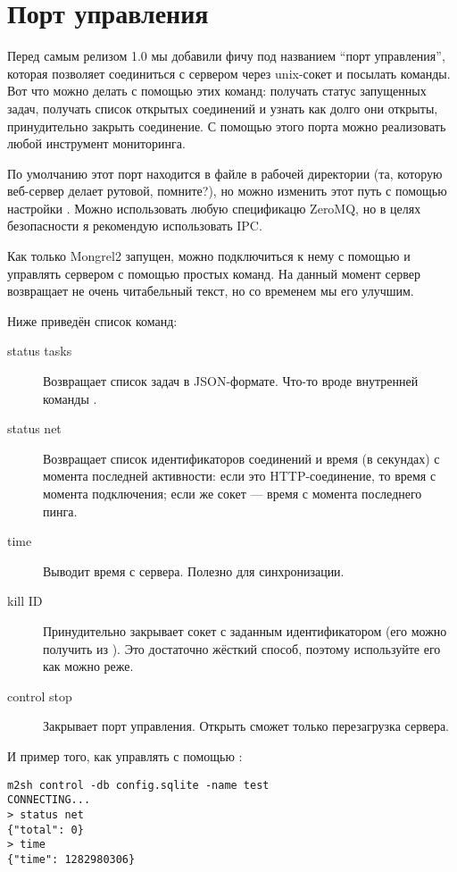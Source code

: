 \section{Порт управления}

Перед самым релизом 1.0 мы добавили фичу под названием ``порт
управления'', которая позволяет соединиться с сервером через unix-сокет
и посылать команды. Вот что можно делать с помощью этих команд:
получать статус запущенных задач, получать список открытых соединений
и узнать как долго они открыты, принудительно закрыть соединение. С
помощью этого порта можно реализовать любой инструмент мониторинга.

По умолчанию этот порт находится в файле  в рабочей
директории (та, которую веб-сервер делает рутовой, помните?), но можно
изменить этот путь с помощью настройки . Можно
использовать любую спецификацю ZeroMQ, но в целях безопасности я
рекомендую использовать IPC.

Как только Mongrel2 запущен, можно подключиться к нему с помощью
 и управлять сервером с помощью простых команд. На данный
момент сервер возвращает не очень читабельный текст, но со временем мы
его улучшим.

Ниже приведён список команд:

\begin{description}
\item[status tasks] Возвращает список задач в JSON-формате. Что-то вроде
    внутренней команды .
\item[status net] Возвращает список идентификаторов соединений и время
    (в секундах) с момента последней активности: если это HTTP-соединение,
    то время с момента подключения; если же сокет --- время с момента
    последнего пинга.
\item[time] Выводит время с сервера. Полезно для синхронизации.
\item[kill ID] Принудительно закрывает сокет с заданным
    идентификатором (его можно получить из ). Это
    достаточно жёсткий способ, поэтому используйте его как можно реже.
\item[control stop] Закрывает порт управления. Открыть сможет только
    перезагрузка сервера.
\end{description}

И пример того, как управлять с помощью :

\begin{Verbatim}
m2sh control -db config.sqlite -name test
CONNECTING...
> status net
{"total": 0}
> time
{"time": 1282980306}
\end{Verbatim}

